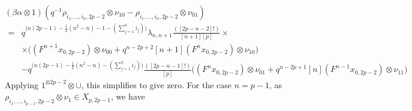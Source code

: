 \documentclass[]{article}
\begin{document}
$(\beta\alpha\otimes 1)(q^{-1}\rho_{i_{1},...,i_{n},2p-2}\otimes\nu_{10}-\rho_{i_{1},...,i_{n},2p-2}\otimes\nu_{01})$
\begin{align*}
=& q^{\big(n(2p-1)-\frac{1}{2}(n^{2}-n)-1-(\sum\limits_{j=1}^{n}i_{j})\big)}\lambda_{n,n+1}\frac{([2p-n-2]!)}{[n+1][p]}\times\\
&\times\bigg((F^{n+1}x_{0,2p-2})\otimes\nu_{00}+q^{n-2p+2}[n+1](F^{n}x_{0,2p-2})\otimes\nu_{10}\bigg)\\
&-q^{\big(n(2p-1)-\frac{1}{2}(n^{2}-n)-(\sum\limits_{j=1}^{n}i_{j})\big)}\frac{([2p-n-1]!)}{[p]}\bigg((F^{n}x_{0,2p-2})\otimes\nu_{01}+q^{n-2p+1}[n](F^{n-1}x_{0,2p-2})\otimes\nu_{11}\bigg)
\end{align*}
Applying $1^{\otimes 2p-2}\otimes\cup$, this simplifies to give zero. For the case $n=p-1$, as $\rho_{i_{1},...,i_{p-1},2p-2}\otimes\nu_{1}\in X_{p,2p-1}$, we have\\
\end{document}
